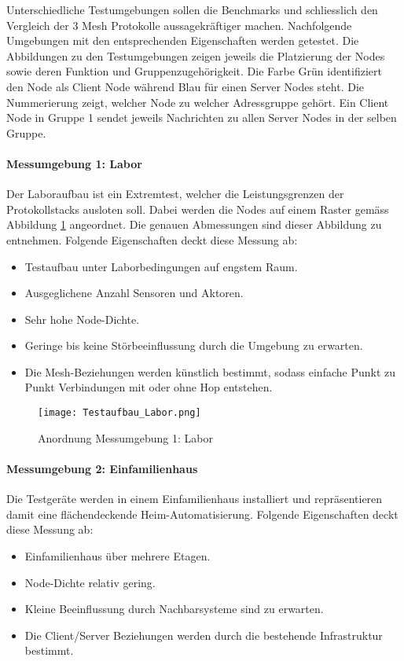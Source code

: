 Unterschiedliche Testumgebungen sollen die Benchmarks und schliesslich den Vergleich der 3 Mesh Protokolle aussagekräftiger machen.
Nachfolgende Umgebungen mit den entsprechenden Eigenschaften werden getestet.
Die Abbildungen zu den Testumgebungen zeigen jeweils die Platzierung der Nodes sowie deren Funktion und Gruppenzugehörigkeit.
Die Farbe Grün identifiziert den Node als Client Node während Blau für einen Server Nodes steht. Die Nummerierung zeigt, welcher Node zu welcher Adressgruppe gehört. Ein Client Node in Gruppe 1 sendet jeweils Nachrichten zu allen Server Nodes in der selben Gruppe.

\paragraph{Messumgebung 1: Labor}
Der Laboraufbau ist ein Extremtest, welcher die Leistungsgrenzen der Protokollstacks ausloten soll. Dabei werden die Nodes auf einem Raster gemäss Abbildung \ref{fig:AnordnungLaborTestumgebungMessumgebung1} angeordnet. Die genauen Abmessungen sind dieser Abbildung zu entnehmen.
Folgende Eigenschaften deckt diese Messung ab:
\begin{itemize}
	\item Testaufbau unter Laborbedingungen auf engstem Raum.
	\item Ausgeglichene Anzahl Sensoren und Aktoren.
	\item Sehr hohe Node-Dichte.
	\item Geringe bis keine Störbeeinflussung durch die Umgebung zu erwarten.
	\item Die Mesh-Beziehungen werden künstlich bestimmt, sodass einfache Punkt zu Punkt Verbindungen mit oder ohne Hop entstehen.
\end{itemize}

\begin{figure}[H]
\centering
\texttt{[image: Testaufbau\_Labor.png]}
\caption{Anordnung Messumgebung 1: Labor}\label{fig:AnordnungLaborTestumgebungMessumgebung1}
\end{figure}

\paragraph{Messumgebung 2: Einfamilienhaus}
Die Testgeräte werden in einem Einfamilienhaus installiert und repräsentieren damit eine flächendeckende Heim-Automatisierung.
Folgende Eigenschaften deckt diese Messung ab:
\begin{itemize}
	\item Einfamilienhaus über mehrere Etagen.
	\item Node-Dichte relativ gering.
	\item Kleine Beeinflussung durch Nachbarsysteme sind zu erwarten.
	\item Die Client\slash Server Beziehungen werden durch die bestehende Infrastruktur bestimmt.
\end{itemize}

